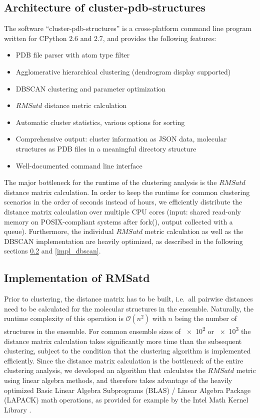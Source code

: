 \subsection{Architecture of cluster-pdb-structures}

The software \enquote{cluster-pdb-structures} is a cross-platform command line
program written for CPython 2.6 and 2.7, and provides the following features:

\begin{itemize}
\item PDB file parser with atom type filter
\item Agglomerative hierarchical clustering (dendrogram display supported)
\item DBSCAN clustering and parameter optimization
\item $RMSatd$ distance metric calculation
\item Automatic cluster statistics, various options for sorting
\item Comprehensive output: cluster information as JSON data, molecular
structures as PDB files in a meaningful directory structure
\item Well-documented command line interface
\end{itemize}

The major bottleneck for the runtime of the clustering analysis is the $RMSatd$
distance matrix calculation. In order to keep the runtime for common clustering
scenarios in the order of seconds instead of hours, we efficiently distribute
the distance matrix calculation over multiple CPU cores (input: shared read-only
memory on POSIX-compliant systems after fork(), output collected with a queue).
Furthermore, the individual $RMSatd$ metric calculation as well as the DBSCAN
implementation are heavily optimized, as described in the following sections
\ref{impl_rmsatd} and \ref{impl_dbscan}.


\subsection{Implementation of RMSatd}
\label{impl_rmsatd}

Prior to clustering, the distance matrix has to be built, i.e.\ all pairwise
distances need to be calculated for the molecular structures in the ensemble.
Naturally, the runtime complexity of this operation is $\mathcal{O}(n^2)$ with
$n$ being the number of structures in the ensemble. For common ensemble sizes of
\num{e2} or \num{e3} the distance matrix calculation takes significantly more
time than the subsequent clustering, subject to the condition that the
clustering algorithm is implemented efficiently. Since the distance matrix
calculation is the bottleneck of the entire clustering analysis, we developed an
algorithm that calculates the $RMSatd$ metric using linear algebra methods, and
therefore takes advantage of the heavily optimized Basic Linear Algebra
Subprograms (BLAS) / Linear Algebra Package (LAPACK) math operations, as
provided for example by the Intel Math Kernel Library \cite{intel_mkl_2014}.

